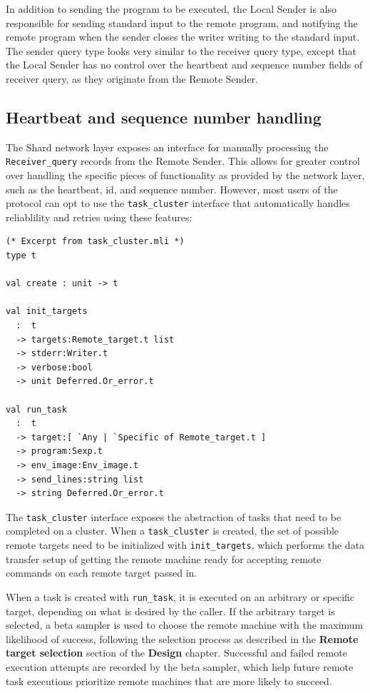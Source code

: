 \documentclass[oneside]{report}
\begin{document}
In addition to sending the program to be executed, the Local Sender is also responsible for sending standard input to the remote program, and notifying the remote program when the sender closes the writer writing to the standard input.
The sender query type looks very similar to the receiver query type, except that the Local Sender has no control over the heartbeat and sequence number fields of receiver query, as they originate from the Remote Sender.

\subsection{Heartbeat and sequence number handling}

The Shard network layer exposes an interface for manually processing the \texttt{Receiver\_query} records from the Remote Sender.
This allows for greater control over handling the specific pieces of functionality as provided by the network layer, such as the heartbeat, id, and sequence number. However, most users of the protocol can opt to use the \texttt{task\_cluster} interface that automatically handles reliablility and retries using these features:

\begin{minipage}[c]{\textwidth-15pt}
  \begin{lstlisting}
(* Excerpt from task_cluster.mli *)
type t

val create : unit -> t

val init_targets
  :  t
  -> targets:Remote_target.t list
  -> stderr:Writer.t
  -> verbose:bool
  -> unit Deferred.Or_error.t

val run_task
  :  t
  -> target:[ `Any | `Specific of Remote_target.t ]
  -> program:Sexp.t
  -> env_image:Env_image.t
  -> send_lines:string list
  -> string Deferred.Or_error.t
\end{lstlisting}
  \smallskip
\end{minipage}

The \texttt{task\_cluster} interface exposes the abstraction of tasks that need to be completed on a cluster.
When a \texttt{task\_cluster} is created, the set of possible remote targets need to be initialized with \texttt{init\_targets}, which performs the data transfer setup of getting the remote machine ready for accepting remote commands on each remote target passed in.

When a task is created with \texttt{run\_task}, it is executed on an arbitrary or specific target, depending on what is desired by the caller.
If the arbitrary target is selected, a beta sampler is used to choose the remote machine with the maximum likelihood of success, following the selection process as described in the \textbf{Remote target selection} section of the \textbf{Design} chapter.
Successful and failed remote execution attempts are recorded by the beta sampler, which help future remote task executions prioritize remote machines that are more likely to succeed.
\end{document}

